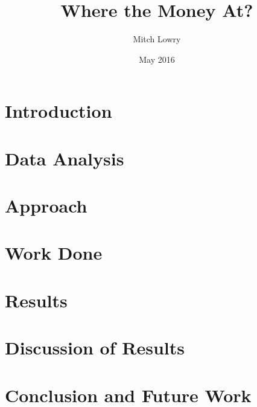 \documentclass{article}
\title{Where the Money At?}
\author{Mitch Lowry}
\date{May 2016}
\begin{document}
\maketitle

\section{Introduction}

 
\section{Data Analysis}


\section{Approach}


\section{Work Done}


\section{Results}


\section{Discussion of Results}


\section{Conclusion and Future Work}



\end{document}
